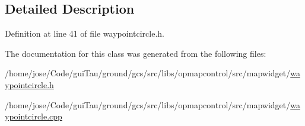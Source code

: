 \subsection{Detailed Description}


Definition at line 41 of file waypointcircle.\-h.



The documentation for this class was generated from the following files\-:\begin{DoxyCompactItemize}
\item 
/home/jose/\-Code/gui\-Tau/ground/gcs/src/libs/opmapcontrol/src/mapwidget/\hyperlink{waypointcircle_8h}{waypointcircle.\-h}\item 
/home/jose/\-Code/gui\-Tau/ground/gcs/src/libs/opmapcontrol/src/mapwidget/\hyperlink{waypointcircle_8cpp}{waypointcircle.\-cpp}\end{DoxyCompactItemize}
